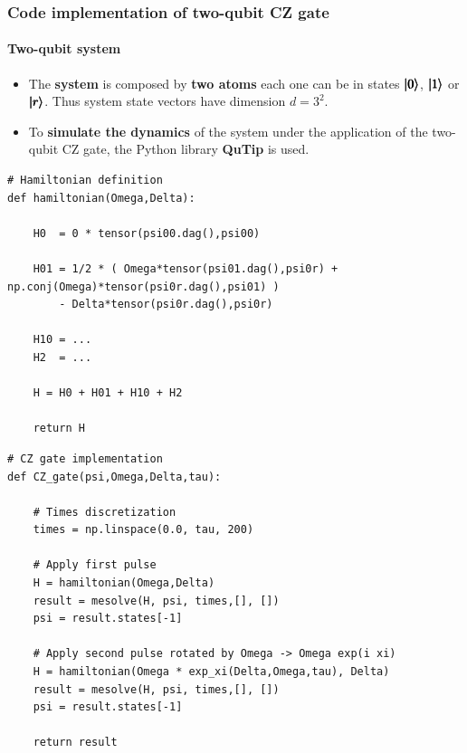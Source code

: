 \documentclass[8pt]{beamer}
\begin{document}
    \begin{frame}[fragile]
    \frametitle{Code implementation of two-qubit CZ gate}
    \framesubtitle{Two-qubit system}	
    
    \begin{itemize}
        \item The \textbf{system} is composed by \textbf{two atoms} each one can be in states $\pmb{\ket{0}}$, $\pmb{\ket{1}}$ or $\pmb{\ket{r}}$. Thus system state vectors have dimension \alert{$d=3^2$}.
        \item To \textbf{simulate the dynamics} of the system under the application of the two-qubit CZ gate, the Python library \textbf{QuTip} is used.
    \end{itemize}

    \begin{minipage}[t]{0.49\linewidth}%
\begin{lstlisting}[style=myPython]
# Hamiltonian definition
def hamiltonian(Omega,Delta):
    
    H0  = 0 * tensor(psi00.dag(),psi00)
    
    H01 = 1/2 * ( Omega*tensor(psi01.dag(),psi0r) + np.conj(Omega)*tensor(psi0r.dag(),psi01) ) 
        - Delta*tensor(psi0r.dag(),psi0r)
    
    H10 = ...
    H2  = ...

    H = H0 + H01 + H10 + H2
    
    return H
\end{lstlisting}
    \end{minipage}
    \begin{minipage}[t]{0.49\linewidth}%
\begin{lstlisting}[style=myPython]
# CZ gate implementation
def CZ_gate(psi,Omega,Delta,tau):
        
    # Times discretization
    times = np.linspace(0.0, tau, 200)
    
    # Apply first pulse 
    H = hamiltonian(Omega,Delta)
    result = mesolve(H, psi, times,[], [])
    psi = result.states[-1]
    
    # Apply second pulse rotated by Omega -> Omega exp(i xi)
    H = hamiltonian(Omega * exp_xi(Delta,Omega,tau), Delta)
    result = mesolve(H, psi, times,[], [])
    psi = result.states[-1] 
        
    return result
\end{lstlisting}
    \end{minipage}
    \end{frame}
\end{document}
